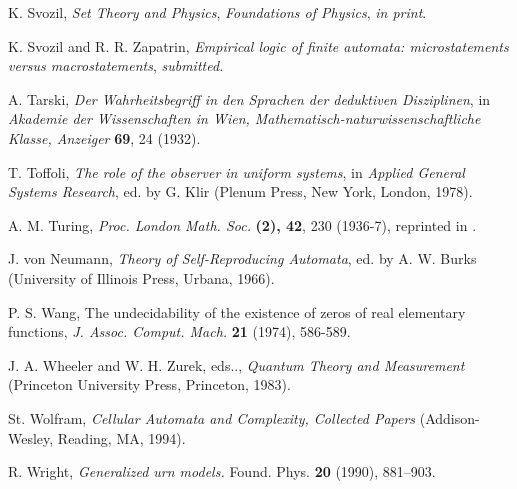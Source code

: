 \begin{thebibliography}{99}
K. Svozil, {\sl Set Theory and Physics},
{\sl Foundations of Physics}, {\it in print}.

 K. Svozil and R. R. Zapatrin,
{\sl Empirical logic of finite automata:
microstatements versus macrostatements},
{\it submitted.}

A. Tarski,
{\sl Der Wahrheitsbegriff in den Sprachen der deduktiven Disziplinen},
in
{\sl Akademie der Wissenschaften in Wien,
Mathematisch-naturwissenschaftliche Klasse, Anzeiger} {\bf 69}, 24
(1932).


 T. Toffoli,
{\sl The role of the observer in uniform systems}, in {\sl Applied
General Systems Research}, ed. by G. Klir (Plenum Press, New York,
London, 1978).

 A. M. Turing, {\sl Proc. London Math. Soc.} {\bf (2), 42}, 230
 (1936-7), reprinted in
 \cite{davis-58}.

 J. von Neumann,
 {\sl Theory of Self-Reproducing Automata}, ed. by A. W. Burks
 (University of Illinois Press, Urbana, 1966).

  P. S. Wang, The undecidability of the existence of
zeros of real elementary functions, {\it J. Assoc. Comput. Mach.}
{\bf 21}
(1974), 586-589.



 J. A. Wheeler and W. H. Zurek, eds..,
 {\sl
 Quantum Theory and Measurement}
 (Princeton University Press, Princeton, 1983).


St. Wolfram,
{\sl Cellular Automata and Complexity, Collected Papers}
(Addison-Wesley, Reading, MA, 1994).

 R. Wright,  {\it Generalized urn models.} Found. Phys.
{\bf 20} (1990), 881--903.
\end{thebibliography}
\newpage
 \tableofcontents

